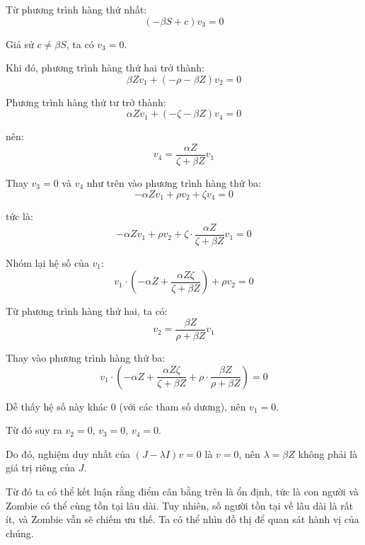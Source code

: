 \documentclass[12pt]{scrartcl}
\begin{document}
Từ phương trình hàng thứ nhất:
\[
(-\beta S + c) v_3 = 0
\]

Giả sử \(c \neq \beta S\), ta có \(v_3 = 0\).

Khi đó, phương trình hàng thứ hai trở thành:
\[
\beta Z v_1 + (-\rho-\beta Z) v_2 = 0
\]

Phương trình hàng thứ tư trở thành:
\[
\alpha Z v_1 + (-\zeta-\beta Z) v_4 = 0
\]

nên:
\[
v_4 = \frac{\alpha Z}{\zeta+\beta Z} v_1
\]

Thay \(v_3=0\) và \(v_4\) như trên vào phương trình hàng thứ ba:
\[
-\alpha Z v_1 + \rho v_2 + \zeta v_4 = 0
\]

tức là:
\[
-\alpha Z v_1 + \rho v_2 + \zeta \cdot \frac{\alpha Z}{\zeta+\beta Z} v_1 = 0
\]

Nhóm lại hệ số của \(v_1\):
\[
v_1 \cdot \left( -\alpha Z + \frac{\alpha Z \zeta}{\zeta+\beta Z} \right) + \rho v_2 = 0
\]

Từ phương trình hàng thứ hai, ta có:
\[
v_2 = \frac{\beta Z}{\rho+\beta Z} v_1
\]

Thay vào phương trình hàng thứ ba:
\[
v_1 \cdot \left( -\alpha Z + \frac{\alpha Z \zeta}{\zeta+\beta Z} + \rho \cdot \frac{\beta Z}{\rho+\beta Z} \right) = 0
\]

Dễ thấy hệ số này khác 0 (với các tham số dương), nên \(v_1=0\).  

Từ đó suy ra \(v_2=0\), \(v_3=0\), \(v_4=0\).

Do đó, nghiệm duy nhất của \((J-\lambda I) v=0\) là \(v=0\), nên \(\lambda = \beta Z\) không phải là giá trị riêng của \(J\).

Từ đó ta có thể kết luận rằng điểm cân bằng trên là ổn định, tức là con người và Zombie có thể cùng tồn tại lâu dài. Tuy nhiên, số người tồn tại về lâu dài là rất ít, và Zombie vẫn sẽ chiếm ưu thế. Ta có thể nhìn đồ thị để quan sát hành vị của chúng.
\end{document}
